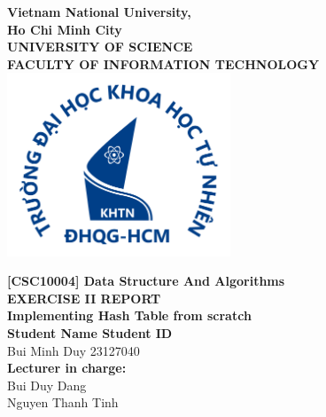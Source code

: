 \begin{titlepage}
	\begin{center}
		\textbf{\LARGE Vietnam National University,}\\[0.5cm]
		\textbf{\LARGE Ho Chi Minh City}\\[0.5cm]
		\vspace{20pt}
		\textbf{\large UNIVERSITY OF SCIENCE}\\[0.2cm]
		\textbf{\large FACULTY OF INFORMATION TECHNOLOGY}\\[0.2cm]
		\vspace{20pt}
		\includegraphics[width=0.5\textwidth,keepaspectratio]{./images/logo.png}

		\par
		\vspace{20pt}
		\textbf{\Large [CSC10004] Data Structure And Algorithms}\\
		\vspace{15pt}
		\myrule[1pt][7pt]
		\textbf{\LARGE EXERCISE II REPORT}\\
		\vspace{15pt}
		\textbf{\large Implementing Hash Table from scratch}\\
		\vspace{10pt}
		\myrule[1pt][7pt]
		\vspace{25pt}
		\textbf{\large Student Name \hspace{20pt} Student ID}\\
		Bui Minh Duy \hspace{45pt} 23127040 \\

		\vspace{45pt}
		\textbf {\large Lecturer in charge:}\\[0.2cm]
		\Large {Bui Duy Dang}\\[0.1cm]
		\Large {Nguyen Thanh Tinh}\\[0.1cm]
	\end{center}

	\par
	\vfill
	\begin{center}
		\\
	\end{center}

\end{titlepage}